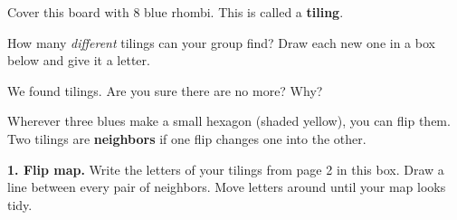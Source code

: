 \noindent
\begin{minipage}[t]{3.1in}\vspace{0pt}\end{minipage}\hfill
\begin{minipage}[t]{4.1in}\vspace{0pt}
Cover this board with 8 blue rhombi. This is called a \textbf{tiling}.

\vspace{0.12in}
How many \emph{different} tilings can your group find? Draw each new one in a box
below and give it a letter.

\vspace{0.12in}
\end{minipage}

\vspace{0.2in}
\noindent
{}\hfill{}\hfill{}\hfill{}

\vspace{0.12in}
\noindent
{}\hfill{}\hfill{}\hfill{}

\vspace{0.12in}
We found \blank[0.6in] tilings. Are you sure there are no more? Why?
\newpage

\noindent
\begin{minipage}[c]{4.1in}\end{minipage}\hfill
\begin{minipage}[c]{3.2in}
Wherever three blues make a small hexagon (shaded yellow), you can flip them.
Two tilings are \textbf{neighbors} if one flip changes one into the other.
\end{minipage}

\vspace{0.2in}
\textbf{1. Flip map.} Write the letters of your tilings from page 2 in this box.
Draw a line between every pair of neighbors. Move letters around until your map looks tidy.

